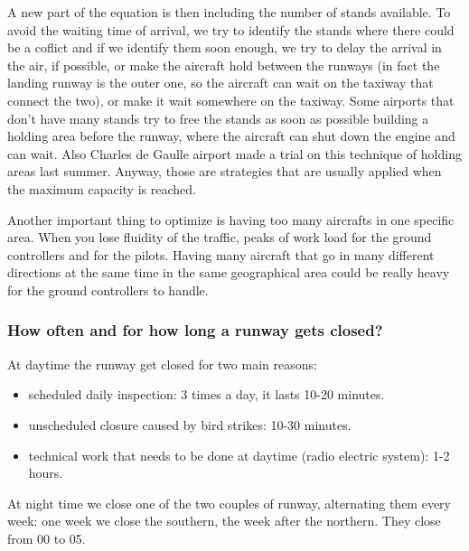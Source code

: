 \documentclass{article}
\begin{document}
A new part of the equation is then including the number of stands available. 
To avoid the waiting time of arrival, we try to identify the stands where there could be a coflict and if we identify them soon enough, we try to delay the arrival in the air, if possible, or make the aircraft hold between the runways (in fact the landing runway is the outer one, so the aircraft can wait on the taxiway that connect the two), or make it wait somewhere on the taxiway.
Some airports that don't have many stands try to free the stands as soon as possible building a holding area before the runway, where the aircraft can shut down the engine and can wait. Also Charles de Gaulle airport made a trial on this technique of holding areas last summer.
Anyway, those are strategies that are usually applied when the maximum capacity is reached.

\bigskip

Another important thing to optimize is having too many aircrafts in one specific area. When you lose fluidity of the traffic, peaks of work load for the ground controllers and for the pilots. Having many aircraft that go in many different directions at the same time in the same geographical area could be really heavy for the ground controllers to handle.

\subsubsection{How often and for how long a runway gets closed?}

At daytime the runway get closed for two main reasons:
\begin{itemize}
	\item scheduled daily inspection: 3 times a day, it lasts 10-20 minutes.
	\item unscheduled closure caused by bird strikes: 10-30 minutes.
	\item technical work that needs to be done at daytime (radio electric system): 1-2 hours.
\end{itemize}
At night time we close one of the two couples of runway, alternating them every week: one week we close the southern, the week after the northern. They close from 00 to 05.
\end{document}
